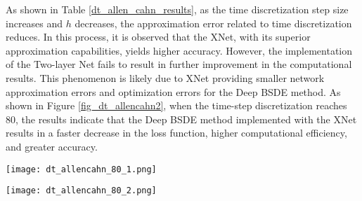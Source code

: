 \documentclass[11pt]{article}
\begin{document}
As shown in Table \ref{dt_allen_cahn_results}, as the time discretization step size increases and $h$ decreases, the approximation error related to time discretization reduces. In this process, it is observed that the XNet, with its superior approximation capabilities, yields higher accuracy. However, the implementation of the Two-layer Net fails to result in further improvement in the computational results. This phenomenon is likely due to XNet providing smaller network approximation errors and optimization errors for the Deep BSDE method.
As shown in Figure \ref{fig_dt_allencahn2}, when the time-step discretization reaches 80, the results indicate that the Deep BSDE method implemented with the XNet results in a faster decrease in the loss function, higher computational efficiency, and greater accuracy. 



\begin{figure*}
	\centering
	\begin{minipage}[t]{0.5\linewidth}
		\centering
		\texttt{[image: dt\_allencahn\_80\_1.png]}
		\label{fig_dt_allencahn_20:first}
	\end{minipage}%
	\hfill
	\begin{minipage}[t]{0.5\linewidth}
		\centering
		\texttt{[image: dt\_allencahn\_80\_2.png]}
		\label{fig_dt_allencahn_20:second}
	\end{minipage}
	\vspace{-0.7cm}
	\centering
	\caption{Comparison of Two Network Architectures for Solving the Allen-Cahn Equation under 80-step-time discretization}
	\label{fig_dt_allencahn2}
\end{figure*}
\end{document}
